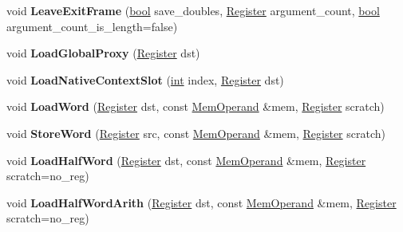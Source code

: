 \begin{DoxyCompactItemize}
void {\bfseries Leave\+Exit\+Frame} (\mbox{\hyperlink{classbool}{bool}} save\+\_\+doubles, \mbox{\hyperlink{classv8_1_1internal_1_1Register}{Register}} argument\+\_\+count, \mbox{\hyperlink{classbool}{bool}} argument\+\_\+count\+\_\+is\+\_\+length=false)
\item 
\mbox{\label{classv8_1_1internal_1_1MacroAssembler_a8139c3ce1dd60f65909755011ef7f9d1}} 
void {\bfseries Load\+Global\+Proxy} (\mbox{\hyperlink{classv8_1_1internal_1_1Register}{Register}} dst)
\item 
\mbox{\label{classv8_1_1internal_1_1MacroAssembler_abb9c73f938328171318c7cc010a7b53c}} 
void {\bfseries Load\+Native\+Context\+Slot} (\mbox{\hyperlink{classint}{int}} index, \mbox{\hyperlink{classv8_1_1internal_1_1Register}{Register}} dst)
\item 
\mbox{\label{classv8_1_1internal_1_1MacroAssembler_a860bc53aeb8c94e01e64fd9f809067c3}} 
void {\bfseries Load\+Word} (\mbox{\hyperlink{classv8_1_1internal_1_1Register}{Register}} dst, const \mbox{\hyperlink{classv8_1_1internal_1_1MemOperand}{Mem\+Operand}} \&mem, \mbox{\hyperlink{classv8_1_1internal_1_1Register}{Register}} scratch)
\item 
\mbox{\label{classv8_1_1internal_1_1MacroAssembler_aa45074a65e6ad5ae1508127cc4ec78dc}} 
void {\bfseries Store\+Word} (\mbox{\hyperlink{classv8_1_1internal_1_1Register}{Register}} src, const \mbox{\hyperlink{classv8_1_1internal_1_1MemOperand}{Mem\+Operand}} \&mem, \mbox{\hyperlink{classv8_1_1internal_1_1Register}{Register}} scratch)
\item 
\mbox{\label{classv8_1_1internal_1_1MacroAssembler_ae69ef9696b1fed470b044a9865b33c10}} 
void {\bfseries Load\+Half\+Word} (\mbox{\hyperlink{classv8_1_1internal_1_1Register}{Register}} dst, const \mbox{\hyperlink{classv8_1_1internal_1_1MemOperand}{Mem\+Operand}} \&mem, \mbox{\hyperlink{classv8_1_1internal_1_1Register}{Register}} scratch=no\+\_\+reg)
\item 
\mbox{\label{classv8_1_1internal_1_1MacroAssembler_a7ca62d0f1456d89d8cf125a0cdaebc7f}} 
void {\bfseries Load\+Half\+Word\+Arith} (\mbox{\hyperlink{classv8_1_1internal_1_1Register}{Register}} dst, const \mbox{\hyperlink{classv8_1_1internal_1_1MemOperand}{Mem\+Operand}} \&mem, \mbox{\hyperlink{classv8_1_1internal_1_1Register}{Register}} scratch=no\+\_\+reg)

\end{DoxyCompactItemize}
